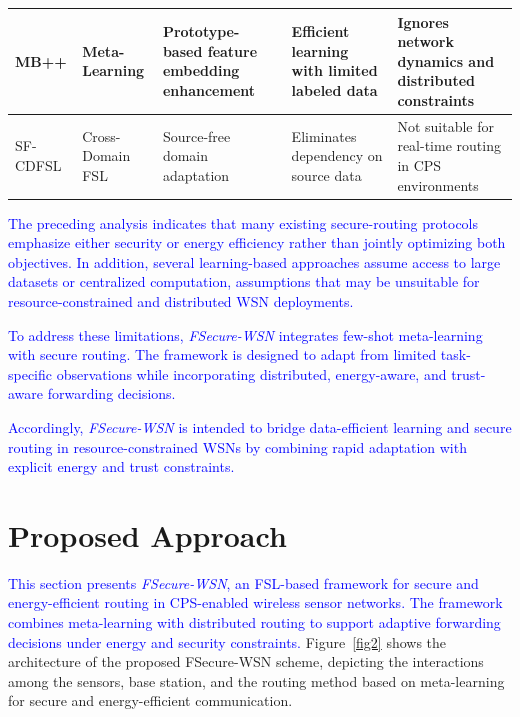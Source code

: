 \documentclass[pdflatex,sn-mathphys-num]{sn-jnl}
\begin{document}
\begin{table}[h]
\begin{tabular}{|p{1.5cm}|p{1.5cm}|p{2.8cm}|p{2cm}|p{2.8cm}|}
\hline

MB++ \cite{zhou2026mate} 
& Meta-Learning 
& Prototype-based feature embedding enhancement 
& Efficient learning with limited labeled data 
& Ignores network dynamics and distributed constraints \\

\hline

SF-CDFSL \cite{zhang2026cdfsl,zhang2026trap} 
& Cross-Domain FSL 
& Source-free domain adaptation 
& Eliminates dependency on source data 
& Not suitable for real-time routing in CPS environments \\

\hline

\end{tabular}
\end{table}

\textcolor{blue}{The preceding analysis indicates that many existing secure-routing protocols emphasize either security or energy efficiency rather than jointly optimizing both objectives. In addition, several learning-based approaches assume access to large datasets or centralized computation, assumptions that may be unsuitable for resource-constrained and distributed WSN deployments.}

\textcolor{blue}{To address these limitations, \textit{FSecure-WSN} integrates few-shot meta-learning with secure routing. The framework is designed to adapt from limited task-specific observations while incorporating distributed, energy-aware, and trust-aware forwarding decisions.}

\textcolor{blue}{Accordingly, \textit{FSecure-WSN} is intended to bridge data-efficient learning and secure routing in resource-constrained WSNs by combining rapid adaptation with explicit energy and trust constraints.}

\section{Proposed Approach}
\label{sec:methodology}

\textcolor{blue}{This section presents \textit{FSecure-WSN}, an FSL-based framework for secure and energy-efficient routing in CPS-enabled wireless sensor networks. The framework combines meta-learning with distributed routing to support adaptive forwarding decisions under energy and security constraints.} Figure~\ref{fig2} shows the architecture of the proposed FSecure-WSN scheme, depicting the interactions among the sensors, base station, and the routing method based on meta-learning for secure and energy-efficient communication.
\end{document}
